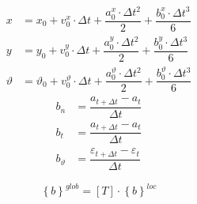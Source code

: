 \documentclass[c]{beamer}  %
\begin{document}
\begin{frame}
\frametitle{\insertsection} 
\framesubtitle{\insertsubsection}
\begin{align}
x &= x_0 + v^x_0 \cdot \Delta t + \dfrac{a^x_0 \cdot \Delta t^2}{2} + \dfrac{b^x_0 \cdot \Delta t^3}{6}\\
y &= y_0 + v^y_0 \cdot \Delta t + \dfrac{a^y_0 \cdot \Delta t^2}{2} + \dfrac{b^y_0 \cdot \Delta t^3}{6}\\
\vartheta &= \vartheta_0 + v^{\vartheta}_0 \cdot \Delta t + \dfrac{a^{\vartheta}_0 \cdot \Delta t^2}{2} + \dfrac{b^{\vartheta}_0 \cdot \Delta t^3}{6}
\end{align}
\begin{align}
b_n &= \dfrac{a_{t + \Delta t} - a_{t}}{\Delta t} \\
b_t &= \dfrac{a_{t + \Delta t} - a_{t}}{\Delta t} \\
b_{\vartheta} &= \dfrac{\varepsilon_{t + \Delta t} - \varepsilon_{t}}{\Delta t} 
\end{align}

\[
\left\lbrace b \right\rbrace^{glob} = [T] \cdot \left\lbrace b \right\rbrace^{loc}
\]
\end{frame}
\end{document}
